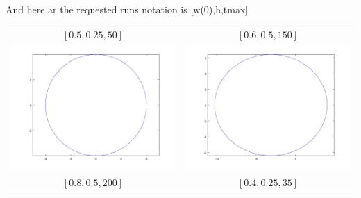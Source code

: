 \documentclass[12pt]{article}
\theoremstyle{homework}
\begin{document}
\begin{enumerate}[(a)]
\begin{tabular}{c c}
\end{tabular}\\
And here ar the requested runs notation is [w(0),h,tmax]\\
\begin{tabular}{c c}
$[0.5,0.25,50]$ & $[0.6,0.5,150]$\\
\includegraphics[scale=.3]{../octave/f4.jpg} & \includegraphics[scale=.3]{../octave/f5.jpg}\\
$[0.8,0.5,200]$ & $[0.4,0.25,35]$\\

\end{tabular}
\end{enumerate}
\end{document}
